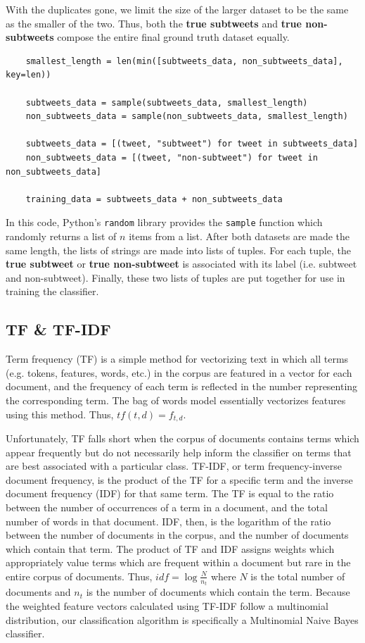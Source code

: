 \documentclass[11pt, twoside, reqno]{book}
\begin{document}
\noindent
With the duplicates gone, we limit the size of the larger dataset to be the same as the smaller of the two. Thus, both the \textbf{true subtweets} and \textbf{true non-subtweets} compose the entire final ground truth dataset equally.

\begin{verbatim}
	smallest_length = len(min([subtweets_data, non_subtweets_data], key=len))
	
	subtweets_data = sample(subtweets_data, smallest_length)
	non_subtweets_data = sample(non_subtweets_data, smallest_length)
	
	subtweets_data = [(tweet, "subtweet") for tweet in subtweets_data]
	non_subtweets_data = [(tweet, "non-subtweet") for tweet in non_subtweets_data]
	
	training_data = subtweets_data + non_subtweets_data
\end{verbatim}

\noindent
In this code, Python's \verb|random| library provides the \verb|sample| function which randomly returns a list of $n$ items from a list. After both datasets are made the same length, the lists of strings are made into lists of tuples. For each tuple, the \textbf{true subtweet} or \textbf{true non-subtweet} is associated with its label (i.e. subtweet and non-subtweet). Finally, these two lists of tuples are put together for use in training the classifier.

\subsection{TF \& TF-IDF}
\label{tf_tf_idf}

Term frequency (TF) is a simple method for vectorizing text in which all terms (e.g. tokens, features, words, etc.) in the corpus are featured in a vector for each document, and the frequency of each term is reflected in the number representing the corresponding term. The bag of words model essentially vectorizes features using this method. Thus, $tf(t,d)=f_{t,d}$.

Unfortunately, TF falls short when the corpus of documents contains terms which appear frequently but do not necessarily help inform the classifier on terms that are best associated with a particular class. TF-IDF, or term frequency-inverse document frequency, is the product of the TF for a specific term and the inverse document frequency (IDF) for that same term. The TF is equal to the ratio between the number of occurrences of a term in a document, and the total number of words in that document. IDF, then, is the logarithm of the ratio between the number of documents in the corpus, and the number of documents which contain that term. The product of TF and IDF assigns weights which appropriately value terms which are frequent within a document but rare in the entire corpus of documents. Thus, $idf=\log\frac{N}{n_{t}}$ where $N$ is the total number of documents and $n_{t}$ is the number of documents which contain the term. Because the weighted feature vectors calculated using TF-IDF follow a multinomial distribution, our classification algorithm is specifically a Multinomial Naive Bayes classifier.
\end{document}
